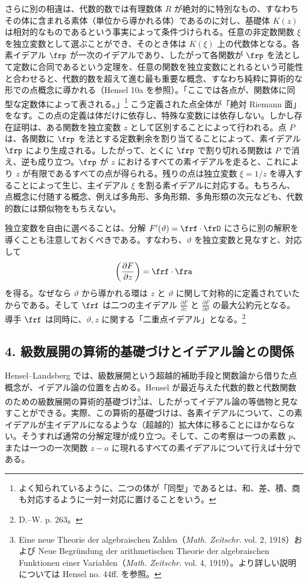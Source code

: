 \documentclass[11pt]{article}
\providecommand{\p}{\partial}
\begin{document}
さらに別の相違は、代数的数では有理数体 \(R\) が絶対的に特別なもの、すなわちその体に含まれる素体（単位から導かれる体）であるのに対し、基礎体 \(K(z)\) は相対的なものであるという事実によって条件づけられる。任意の非定数関数 \(\xi\) を独立変数として選ぶことができ、そのとき体は \(K(\xi)\) 上の代数体となる。各素イデアル \(\frp\) が一次のイデアルであり、したがって各関数が \(\frp\) を法として定数に合同であるという定理を、任意の関数を独立変数にとれるという可能性と合わせると、代数的数を超えて進む最も重要な概念、すなわち純粋に算術的な形での点概念に導かれる（Hensel 10a を参照）。「ここでは各点が、関数体に同型な定数体によって表される。」\footnote{よく知られているように、二つの体が「同型」であるとは、和、差、積、商も対応するように一対一対応に置けることをいう。} こう定義された点全体が「絶対 Riemann 面」をなす。この点の定義は体だけに依存し、特殊な変数には依存しない。しかし存在証明は、ある関数を独立変数 \(z\) として区別することによって行われる。点 \(P\) は、各関数に \(\frp\) を法とする定数剰余を割り当てることによって、素イデアル \(\frp\) により生成される。したがって、とくに \(\frp\) で割り切れる関数は \(P\) で消え、逆も成り立つ。\(\frp\) が \(z\) におけるすべての素イデアルを走ると、これにより \(z\) が有限であるすべての点が得られる。残りの点は独立変数 \(\xi=1/z\) を導入することによって生じ、主イデアル \(\xi\) を割る素イデアルに対応する。もちろん、点概念に付随する概念、例えば多角形、多角形類、多角形類の次元なども、代数的数には類似物をもちえない。

独立変数を自由に選べることは、分解 \(F'(\vartheta)=\frf\cdot\frD\) にさらに別の解釈を導くことも注意しておくべきである。すなわち、\(\vartheta\) を独立変数と見なすと、対応して
\[
\left(\frac{\p F}{\p z}\right)=\frf\cdot\fra
\]
を得る。なぜなら \(\vartheta\) から導かれる環は \(z\) と \(\vartheta\) に関して対称的に定義されていたからである。そして \(\frf\) は二つの主イデアル \(\frac{\p F}{\p z}\) と \(\frac{\p F}{\p\vartheta}\) の最大公約元となる。導手 \(\frf\) は同時に、\(\vartheta,z\) に関する「二重点イデアル」となる。\footnote{D.--W. p. 263。}

\subsection*{4. 級数展開の算術的基礎づけとイデアル論との関係}
Hensel--Landsberg では、級数展開という超越的補助手段と関数論から借りた点概念が、イデアル論の位置を占める。Hensel が最近与えた代数的数と代数関数のための級数展開の算術的基礎づけ\footnote{Eine neue Theorie der algebraischen Zahlen（\emph{Math. Zeitschr.} vol. 2, 1918）および Neue Begründung der arithmetischen Theorie der algebraischen Funktionen einer Variablen（\emph{Math. Zeitschr.} vol. 4, 1919）。より詳しい説明については Hensel no. 44ff. を参照。}は、したがってイデアル論の等価物と見なすことができる。実際、この算術的基礎づけは、各素イデアルについて、この素イデアルが主イデアルになるような（超越的）拡大体に移ることにほかならない。そうすれば通常の分解定理が成り立つ。そして、この考察は一つの素数 \(p\)、または一つの一次関数 \(z-a\) に現れるすべての素イデアルについて行えば十分である。
\end{document}
